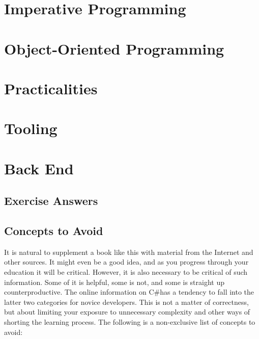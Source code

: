 \documentclass[a4paper, oneside]{memoir}
\newcommand{\csharp}{C{\lserif\#}}
\begin{document}





\part{Imperative Programming}
\label{part:ip}









\part{Object-Oriented Programming}
\label{part:oo}







\part{Practicalities}
\label{part:prac}





\part{Tooling}
\label{part:tool}






\part{Back End}
\appendix

\chapter{Exercise Answers}


\chapter{Concepts to Avoid}

It is natural to supplement a book like this with material from the Internet and other sources. It might even be a good idea, and as you progress through your education it will be critical. However, it is also necessary to be critical of such information. Some of it is helpful, some is not, and some is straight up counterproductive. The online information on \csharp has a tendency to fall into the latter two categories for novice developers. This is not a matter of correctness, but about limiting your exposure to unnecessary complexity and other ways of shorting the learning process. The following is a non-exclusive list of concepts to avoid:
\end{document}
